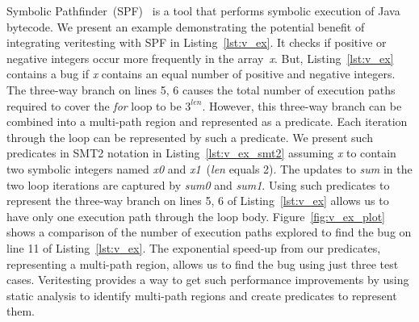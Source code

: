 Symbolic Pathfinder~(SPF)~\cite{spf} is a tool that performs symbolic execution of Java bytecode.
%
%
We present an example demonstrating the potential benefit of integrating veritesting with SPF in Listing~\ref{lst:v_ex}.
%
It checks if positive or negative integers occur more frequently in the
array~\textit{x}.
%
But, Listing~\ref{lst:v_ex} contains a bug if \textit{x} contains an
equal number of positive and negative integers.
%
The three-way branch on lines 5, 6 causes the total number of execution
paths required to cover the \textit{for} loop to be $3^{\textit{len}}$.
%
However, this three-way branch can be combined into a multi-path region
and represented as a predicate.
%
Each iteration through the loop can be represented by such a predicate.
%
We present such predicates in SMT2 notation in
Listing~\ref{lst:v_ex_smt2} assuming \textit{x} to contain two symbolic
integers named \textit{x0} and \textit{x1}~(\textit{len} equals 2).
%
The updates to \textit{sum} in the two loop iterations are captured by
\textit{sum0} and \textit{sum1}.
%
Using such predicates to represent the three-way branch on lines 5, 6 of
Listing~\ref{lst:v_ex} allows us to have only one execution path through
the loop body.
%
Figure~\ref{fig:v_ex_plot} shows a comparison of the number of execution
paths explored to find the bug on line 11 of Listing~\ref{lst:v_ex}.
%
The exponential speed-up from our predicates, representing a multi-path
region, allows us to find
the bug using just three test cases.
%
Veritesting provides a way to get such performance improvements by using
static analysis to identify multi-path
regions and create predicates to represent them.
%

%
